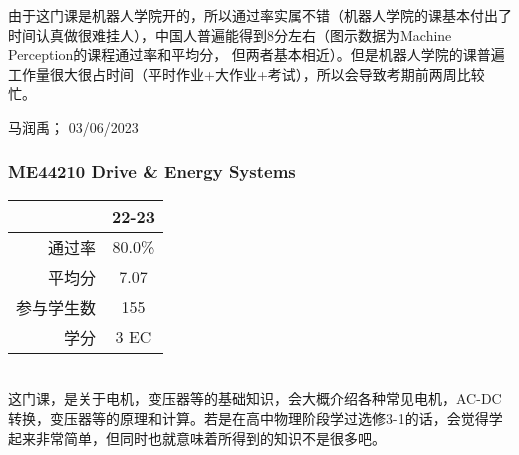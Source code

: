 由于这门课是机器人学院开的，所以通过率实属不错（机器人学院的课基本付出了时间认真做很难挂人），中国人普遍能得到8分左右（图示数据为Machine Perception的课程通过率和平均分， 但两者基本相近）。但是机器人学院的课普遍工作量很大很占时间（平时作业+大作业+考试），所以会导致考期前两周比较忙。

\begin{flushright}
马润禹； 03/06/2023
\end{flushright}

\subsubsection{ME44210 Drive \& Energy Systems}
\begin{minipage}{0.45\textwidth}
\centering
{}
\end{minipage}%
\begin{minipage}{0.45\textwidth}
\raggedleft
\begin{tabular}{r|c}
\textbf{ } & \textbf{22-23} \\ \hline
通过率 & 80.0\% \\ 
平均分 & 7.07 \\ 
参与学生数 & 155 \\ 
学分 & 3 EC\\
\end{tabular}
\end{minipage}\\

这门课，是关于电机，变压器等的基础知识，会大概介绍各种常见电机，AC-DC转换，变压器等的原理和计算。若是在高中物理阶段学过选修3-1的话，会觉得学起来非常简单，但同时也就意味着所得到的知识不是很多吧。

